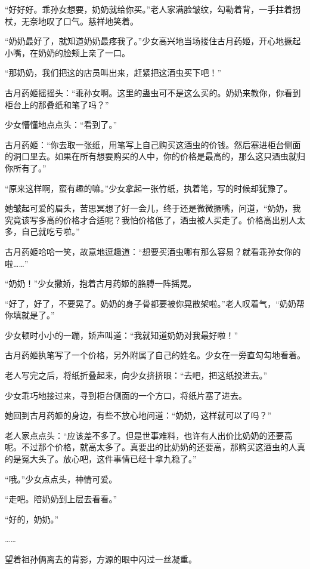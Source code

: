 \begin{this_body}
“好好好。乖孙女想要，奶奶就给你买。”老人家满脸皱纹，勾勒着背，一手拄着拐杖，无奈地叹了口气。慈祥地笑着。

“奶奶最好了，就知道奶奶最疼我了。”少女高兴地当场搂住古月药姬，开心地撅起小嘴，在奶奶的脸颊上亲了一口。

“那奶奶，我们把这的店员叫出来，赶紧把这酒虫买下吧！”

古月药姬摇摇头：“乖孙女啊。这里的蛊虫可不是这么买的。奶奶来教你，你看到柜台上的那叠纸和笔了吗？”

少女懵懂地点点头：“看到了。”

古月药姬：“你去取一张纸，用笔写上自己购买这酒虫的价钱。然后塞进柜台侧面的洞口里去。如果在所有想要购买的人中，你的价格是最高的，那么这只酒虫就归你所有了。”

“原来这样啊，蛮有趣的嘛。”少女拿起一张竹纸，执着笔，写的时候却犹豫了。

她皱起可爱的眉头，苦思冥想了好一会儿，终于还是微微撅嘴，问道，“奶奶，我究竟该写多高的价格才合适呢？我怕价格低了，酒虫被人买走了。价格高出别人太多，自己就吃亏啦。”

古月药姬哈哈一笑，故意地逗趣道：“想要买酒虫哪有那么容易？就看乖孙女你的啦……”

“奶奶！”少女撒娇，抱着古月药姬的胳膊一阵摇晃。

“好了，好了，不要晃了。奶奶的身子骨都要被你晃散架啦。”老人叹着气，“奶奶帮你填就是了。”

少女顿时小小的一蹦，娇声叫道：“我就知道奶奶对我最好啦！”

古月药姬执笔写了一个价格，另外附属了自己的姓名。少女在一旁直勾勾地看着。

老人写完之后，将纸折叠起来，向少女挤挤眼：“去吧，把这纸投进去。”

少女乖巧地接过来，寻到柜台侧面的一个方口，将纸片塞了进去。

她回到古月药姬的身边，有些不放心地问道：“奶奶，这样就可以了吗？”

老人家点点头：“应该差不多了。但是世事难料，也许有人出价比奶奶的还要高呢。不过那个价格，就高太多了。真要出的比奶奶的还要高，那购买这酒虫的人真的是冤大头了。放心吧，这件事情已经十拿九稳了。”

“哦。”少女点点头，神情可爱。

“走吧。陪奶奶到上层去看看。”

“好的，奶奶。”

……

望着祖孙俩离去的背影，方源的眼中闪过一丝凝重。


\end{this_body}
